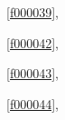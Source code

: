 \noindent\filesourcenumbernameone\ \ref{f000039},\ \pageref{f000039}%

\noindent\filesourcenumbernameone\ \ref{f000042},\ \pageref{f000042}%

\noindent\filesourcenumbernameone\ \ref{f000043},\ \pageref{f000043}%

\noindent\filesourcenumbernameone\ \ref{f000044},\ \pageref{f000044}%









